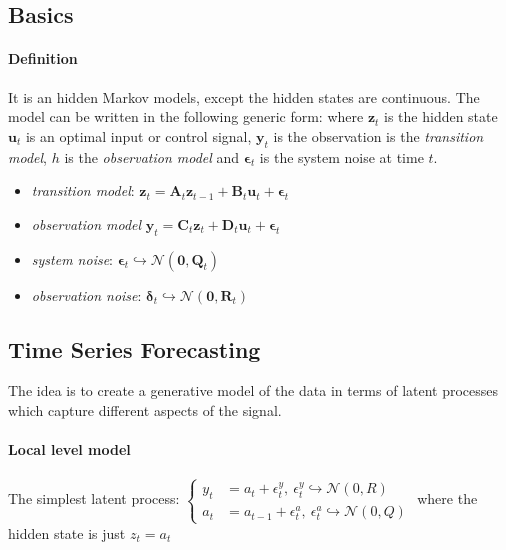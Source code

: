 \subsection{Basics}
\paragraph{Definition}
It is an hidden Markov models, except the hidden states are continuous.
The model can be written in the following generic form: 
where $\bm{z}_{t}$ is the hidden state $\bm{u}_{t}$ is an optimal input or control signal, $\bm{y}_{
t}$ is the observation is the \emph{transition model}, $h$ is the \emph{observation model} and $\bm{
\epsilon}_{t}$ is the system noise at time $t$.
\begin{itemize}
    \item \emph{transition model}: $\bm{z}_{t} = \bm{A}_{t}\bm{z}_{t-1} + \bm{B}_{t}\bm{u}_{t} +
        \bm{\epsilon}_{t}$
    \item \emph{observation model} $\bm{y}_{t} = \bm{C}_{t}\bm{z}_{t} + \bm{D}_{t}\bm{u}_{t} + \bm{
        \epsilon}_{t}$
    \item \emph{system noise}: $\bm{\epsilon}_{t}\hookrightarrow \mathcal{N}(\bm{0}, \bm{Q}_{t})$
    \item \emph{observation noise}: $\bm{\delta}_{t}\hookrightarrow \mathcal{N}(\bm{0}, \bm{R}_{t})$
\end{itemize}

\subsection{Time Series Forecasting}
The idea is to create a generative model of the data in terms of latent processes which capture 
different aspects of the signal.

\paragraph{Local level model}
The simplest latent process:
$\begin{cases}
    y_{t} &= a_{t} + \epsilon^{y}_{t},~\epsilon^{y}_{t}\hookrightarrow \mathcal{N}(0, R)\\
    a_{t} &= a_{t-1} + \epsilon^{a}_{t},~\epsilon^{a}_{t}\hookrightarrow \mathcal{N}(0, Q)
\end{cases}$
where the hidden state is just $z_{t}=a_{t}$
